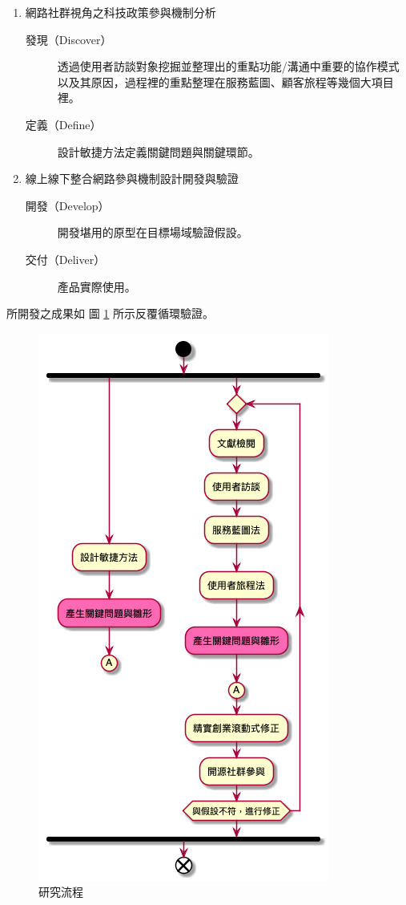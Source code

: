 \documentclass[12pt,a4paper]{article}
\begin{document}
\begin{enumerate}
\item 網路社群視角之科技政策參與機制分析
\begin{description}
\item[{發現（Discover）}] 透過使用者訪談對象挖掘並整理出的重點功能/溝通中重要的協作模式以及其原因，過程裡的重點整理在服務藍圖、顧客旅程等幾個大項目裡。
\item[{定義（Define）}] 設計敏捷方法定義關鍵問題與關鍵環節。
\end{description}
\item 線上線下整合網路參與機制設計開發與驗證
\begin{description}
\item[{開發（Develop）}] 開發堪用的原型在目標場域驗證假設。
\item[{交付（Deliver）}] 產品實際使用。
\end{description}
\end{enumerate}

所開發之成果如 圖 \ref{fig:research_flow} 所示反覆循環驗證。
\begin{figure}[htbp]
\centering
\includegraphics[width=.9\linewidth]{./images/research_flow.png}
\caption{\label{fig:research_flow}
研究流程}
\end{figure}
\end{document}
